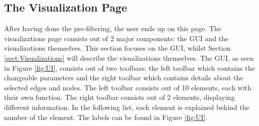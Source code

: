 \documentclass[journal]{vgtc}                %
\begin{document}
\subsection{The Visualization Page} \label{sect:vispage} %
After having done the pre-filtering, the user ends up on this page. The visualizations page consists out of 2 major components: the GUI and the visualizations themselves. This section focuses on the GUI, whilst Section \ref{sect:Visualizations} will describe the visualizations themselves. The GUI, as seen in Figure \ref{fig:UI}, consists out of two toolbars: the left toolbar which contains the changeable parameters and the right toolbar which contains details about the selected edges and nodes. The left toolbar consists out of 10 elements, each with their own function. The right toolbar consists out of 2 elements, displaying different information. In the following list, each element is explained behind the number of the element. The labels can be found in Figure \ref{fig:UI}.
\end{document}
